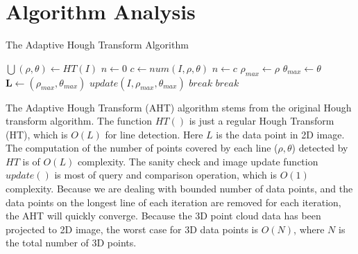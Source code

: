 
\section{Algorithm Analysis}
\label{sec:PE_AA}

\begin{algorithm}
\caption{The Adaptive Hough Transform Algorithm}
\label{alg.AHT}
\begin{algorithmic}[1]
\State $\bigcup{(\rho, \theta)} \leftarrow HT (I)$  
\State $n \leftarrow 0 $
     \State $c \leftarrow num(I, \rho, \theta)$  
         \State $n \leftarrow c$
         \State $\rho_{max} \leftarrow \rho$
         \State $\theta_{max} \leftarrow \theta$
     \EndIf
\EndFor
{}   
\State $\boldsymbol{L} \leftarrow (\rho_{max}, \theta_{max})$
\State $update(I, \rho_{max}, \theta_{max})$ 
\Else
\State $break$
\EndIf
{} 
\State $break$
\EndIf
\EndWhile
\EndProcedure
\end{algorithmic}
\end{algorithm}

The Adaptive Hough Transform (AHT) algorithm stems from the original Hough transform algorithm.
The function $HT()$ is just a regular Hough Transform (HT), which is $O(L)$ for line detection. 
Here $L$ is the data point in 2D image.  The computation of the number of points covered by 
each line  ($\rho, \theta$) detected by $HT$ is of $O(L)$ complexity.
The sanity check and image update function $update()$ is most of query and comparison operation, which is
$O(1)$ complexity. Because we are dealing with bounded number of data points, and the data points
on the longest line of each iteration are removed for each iteration, the AHT will quickly converge.
Because the 3D point cloud data has been projected to 2D image, the worst case for 3D data points is
$O(N)$, where $N$ is the total number of 3D points.

